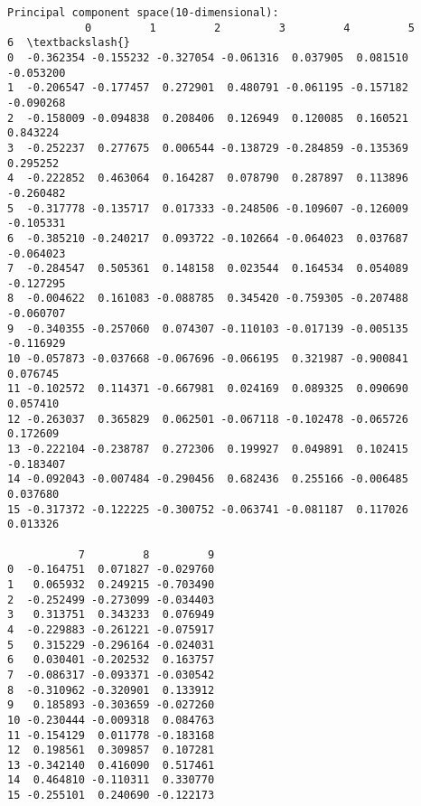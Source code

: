 \documentclass[11pt]{article}
\begin{document}
    \begin{Verbatim}[commandchars=\\\{\}]
Principal component space(10-dimensional): 
            0         1         2         3         4         5         6  \textbackslash{}
0  -0.362354 -0.155232 -0.327054 -0.061316  0.037905  0.081510 -0.053200   
1  -0.206547 -0.177457  0.272901  0.480791 -0.061195 -0.157182 -0.090268   
2  -0.158009 -0.094838  0.208406  0.126949  0.120085  0.160521  0.843224   
3  -0.252237  0.277675  0.006544 -0.138729 -0.284859 -0.135369  0.295252   
4  -0.222852  0.463064  0.164287  0.078790  0.287897  0.113896 -0.260482   
5  -0.317778 -0.135717  0.017333 -0.248506 -0.109607 -0.126009 -0.105331   
6  -0.385210 -0.240217  0.093722 -0.102664 -0.064023  0.037687 -0.064023   
7  -0.284547  0.505361  0.148158  0.023544  0.164534  0.054089 -0.127295   
8  -0.004622  0.161083 -0.088785  0.345420 -0.759305 -0.207488 -0.060707   
9  -0.340355 -0.257060  0.074307 -0.110103 -0.017139 -0.005135 -0.116929   
10 -0.057873 -0.037668 -0.067696 -0.066195  0.321987 -0.900841  0.076745   
11 -0.102572  0.114371 -0.667981  0.024169  0.089325  0.090690  0.057410   
12 -0.263037  0.365829  0.062501 -0.067118 -0.102478 -0.065726  0.172609   
13 -0.222104 -0.238787  0.272306  0.199927  0.049891  0.102415 -0.183407   
14 -0.092043 -0.007484 -0.290456  0.682436  0.255166 -0.006485  0.037680   
15 -0.317372 -0.122225 -0.300752 -0.063741 -0.081187  0.117026  0.013326   

           7         8         9  
0  -0.164751  0.071827 -0.029760  
1   0.065932  0.249215 -0.703490  
2  -0.252499 -0.273099 -0.034403  
3   0.313751  0.343233  0.076949  
4  -0.229883 -0.261221 -0.075917  
5   0.315229 -0.296164 -0.024031  
6   0.030401 -0.202532  0.163757  
7  -0.086317 -0.093371 -0.030542  
8  -0.310962 -0.320901  0.133912  
9   0.185893 -0.303659 -0.027260  
10 -0.230444 -0.009318  0.084763  
11 -0.154129  0.011778 -0.183168  
12  0.198561  0.309857  0.107281  
13 -0.342140  0.416090  0.517461  
14  0.464810 -0.110311  0.330770  
15 -0.255101  0.240690 -0.122173  

    \end{Verbatim}


    
    
    
    
\end{document}
